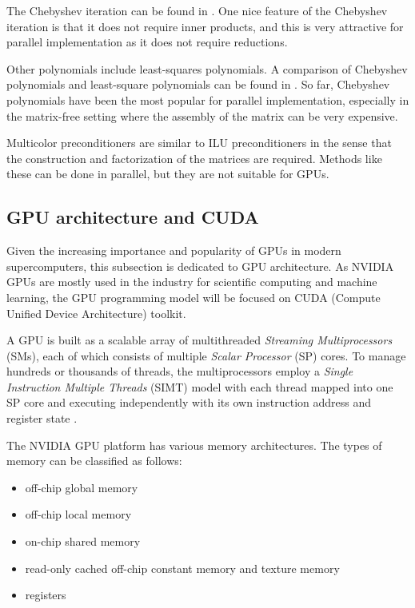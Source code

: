 The Chebyshev iteration can be found in \cite{saad2003iterative}. One nice feature of the Chebyshev iteration is that it does not require inner products, and this is very attractive for parallel implementation as it does not require reductions.

Other polynomials include least-squares polynomials. A comparison of Chebyshev polynomials and least-square polynomials can be found in \cite{ashby1992comparison}. So far, Chebyshev polynomials have been the most popular for parallel implementation, especially in the matrix-free setting where the assembly of the matrix can be very expensive.

Multicolor preconditioners are similar to ILU preconditioners in the sense that the construction and factorization of the matrices are required. Methods like these can be done in parallel, but they are not suitable for GPUs.


\subsection{GPU architecture and CUDA}
Given the increasing importance and popularity of GPUs in modern supercomputers, this subsection is dedicated to GPU architecture. As NVIDIA GPUs are mostly used in the industry for scientific computing and machine learning, the GPU programming model will be focused on CUDA (Compute Unified Device Architecture) toolkit.

A GPU is built as a scalable array of multithreaded \textit{Streaming Multiprocessors} (SMs), each of which consists of multiple \textit{Scalar Processor} (SP) cores. To manage hundreds or thousands of threads, the multiprocessors employ a \textit{Single Instruction Multiple Threads} (SIMT) model with each thread mapped into one SP core and executing independently with its own instruction address and register state \cite{wilt2013cuda}. 

The NVIDIA GPU platform has various memory architectures. The types of memory can be classified as follows:
\begin{itemize}
    \item off-chip global memory
    \item off-chip local memory
    \item on-chip shared memory
    \item read-only cached off-chip constant memory and texture memory
    \item registers
\end{itemize}

